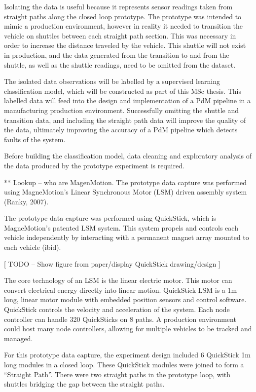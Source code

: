 \documentclass[]{article}
\begin{document}
Isolating the data is useful because it represents sensor readings taken
from straight paths along the closed loop prototype. The prototype was
intended to mimic a production environment, however in reality it needed
to transition the vehicle on shuttles between each straight path
section. This was necessary in order to increase the distance traveled
by the vehicle. This shuttle will not exist in production, and the data
generated from the transition to and from the shuttle, as well as the
shuttle readings, need to be omitted from the dataset.

The isolated data observations will be labelled by a supervised learning
classification model, which will be constructed as part of this MSc
thesis. This labelled data will feed into the design and implementation
of a PdM pipeline in a manufacturing production environment.
Successfully omitting the shuttle and transition data, and including the
straight path data will improve the quality of the data, ultimately
improving the accuracy of a PdM pipeline which detects faults of the
system.

Before building the classification model, data cleaning and exploratory
analysis of the data produced by the prototype experiment is required.

** Lookup -- who are MagenMotion. The prototype data capture was
performed using MagneMotion's Linear Synchronous Motor (LSM) driven
assembly system (Ranky, 2007).

The prototype data capture was performed using QuickStick, which is
MagneMotion's patented LSM system. This system propels and controls each
vehicle independently by interacting with a permanent magnet array
mounted to each vehicle (ibid).

{[} TODO -- Show figure from paper/display QuickStick drawing/design {]}

The core technology of an LSM is the linear electric motor. This motor
can convert electrical energy directly into linear motion. QuickStick
LSM is a 1m long, linear motor module with embedded position sensors and
control software. QuickStick controls the velocity and acceleration of
the system. Each node controller can handle 320 QuickSticks on 8 paths.
A production environment could host many node controllers, allowing for
multiple vehicles to be tracked and managed.

For this prototype data capture, the experiment design included 6
QuickStick 1m long modules in a closed loop. These QuickStick modules
were joined to form a ``Straight Path''. There were two straight paths
in the prototype loop, with shuttles bridging the gap between the
straight paths.
\end{document}
